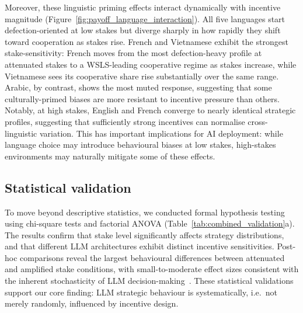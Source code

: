 \documentclass[a4paper,fleqn]{cas-sc}
\begin{document}
Moreover, these linguistic priming effects interact dynamically with incentive magnitude (Figure~\ref{fig:payoff_language_interaction}). All five languages start defection-oriented at low stakes but diverge sharply in how rapidly they shift toward cooperation as stakes rise. French and Vietnamese exhibit the strongest stake-sensitivity: French moves from the most defection-heavy profile at attenuated stakes to a WSLS-leading cooperative regime as stakes increase, while Vietnamese sees its cooperative share rise substantially over the same range. Arabic, by contrast, shows the most muted response, suggesting that some culturally-primed biases are more resistant to incentive pressure than others. Notably, at high stakes, English and French converge to nearly identical strategic profiles, suggesting that sufficiently strong incentives can normalise cross-linguistic variation. This has important implications for AI deployment: while language choice may introduce behavioural biases at low stakes, high-stakes environments may naturally mitigate some of these effects.

\FloatBarrier

\subsection{Statistical validation}\label{sec:statistical_validation}

To move beyond descriptive statistics, we conducted formal hypothesis testing using chi-square tests and factorial ANOVA (Table~\ref{tab:combined_validation}a). The results confirm that stake level significantly affects strategy distributions, and that different LLM architectures exhibit distinct incentive sensitivities. Post-hoc comparisons reveal the largest behavioural differences between attenuated and amplified stake conditions, with small-to-moderate effect sizes consistent with the inherent stochasticity of LLM decision-making~\cite{fontana2025nicer}. These statistical validations support our core finding: LLM strategic behaviour is systematically, i.e.\ not merely randomly, influenced by incentive design.
\end{document}
